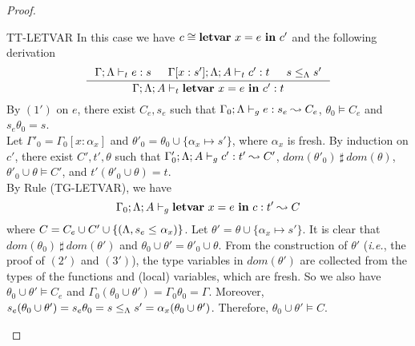 {{{\begin{proof}
\begin{ProofEnumDesc}
\item[TT-LETVAR] In this case we have $c\cong {\textbf{letvar}~ {x} = {e} ~\textbf{in}~ {c'}}$ and the following derivation
\begin{equation*}
\inference
{\Gamma;\trace \vdash_{t} e : s &
\Gamma[x:s']; \trace; A \vdash_{t} c' : t & s \leq_{\trace} s' }
{\Gamma;\trace; A\vdash_{t} \lcLETVAR{x}{e}{c'} :  t}
\end{equation*}
By $(1')$ on $e$, there exist $C_{e}, s_{e}$ such that $\Gamma_{0};\Lambda \vdash_{g} e : s_{e} \leadsto C_{e}$,
$\theta_{0} \vDash C_{e}$ and $s_{e}\theta_{0} = s$.\\
Let $\Gamma'_{0} = \Gamma_{0}[x:\alpha_x]$ and $\theta'_{0} = \theta_0\cup\{\alpha_x \mapsto s'\}$, where $\alpha_x$ is fresh.
By induction on $c'$, there exist $C', t',\theta$ such that $\Gamma'_{0};\Lambda; A \vdash_{g} c' : t' \leadsto C'$,  $dom(\theta'_{0})~\sharp~ dom(\theta)$,  $\theta'_{0}\cup\theta \vDash C'$,  and $t'(\theta'_{0}\cup\theta) = t$. \\
By Rule (TG-LETVAR), we have
$$
\Gamma_0;\Lambda; A\vdash_{g} {\textbf{letvar}~ {x} = {e} ~\textbf{in}~ {c}} :  t'\leadsto C
$$
where $C = C_{e} \cup C' \cup \{ (\Lambda, s_{e} \leq_{} \alpha_x)\}$.
Let $\theta' = \theta\cup \{\alpha_x\mapsto s'\}$. It is clear that $dom(\theta_{0})~\sharp~ dom(\theta')$
and $\theta_{0}\cup\theta' = \theta'_{0}\cup\theta$.
From the construction of $\theta'$ (\emph{i.e.}, the proof of $(2')$ and $(3')$), the type variables in $dom(\theta')$ are collected from the types of the functions and (local) variables, which are fresh.
So we also have $\theta_{0}\cup\theta'\vDash C_{e}$ and $\Gamma_{0}(\theta_{0}\cup\theta') =\Gamma_{0}\theta_{0}=\Gamma $.
Moreover,  $s_{e}(\theta_{0}\cup\theta')=s_{e}\theta_{0}=s\leq_{\Lambda} s' = \alpha_x(\theta_{0}\cup\theta')$.
Therefore, $\theta_{0}\cup\theta'\vDash C$.


\end{ProofEnumDesc}
\end{proof}}}}
